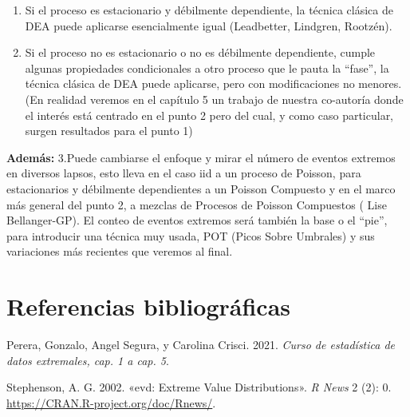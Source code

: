 \documentclass[
  oneside]{book}
\providecommand{\tightlist}{%
  \setlength{\itemsep}{0pt}\setlength{\parskip}{0pt}}
\newlength{\cslhangindent}
\newlength{\cslentryspacingunit} %
\newenvironment{CSLReferences}[2] %
 {%
  \setlength{\parindent}{0pt}
  \ifodd #1
  \let\oldpar\par
  \def\par{\hangindent=\cslhangindent\oldpar}
  \fi
  \setlength{\parskip}{#2\cslentryspacingunit}
 }%
 {}
\begin{document}
\begin{enumerate}
\def\labelenumi{\arabic{enumi}.}
\tightlist
\item
  Si el proceso es estacionario y débilmente dependiente, la técnica
  clásica de DEA puede aplicarse esencialmente igual (Leadbetter,
  Lindgren, Rootzén).
\item
  Si el proceso no es estacionario o no es débilmente dependiente,
  cumple algunas propiedades condicionales a otro proceso que le pauta
  la ``fase'', la técnica clásica de DEA puede aplicarse, pero con
  modificaciones no menores. (En realidad veremos en el capítulo 5 un
  trabajo de nuestra co-autoría donde el interés está centrado en el
  punto 2 pero del cual, y como caso particular, surgen resultados para
  el punto 1)
\end{enumerate}

\textbf{Además:} 3.Puede cambiarse el enfoque y mirar el número de
eventos extremos en diversos lapsos, esto lleva en el caso iid a un
proceso de Poisson, para estacionarios y débilmente dependientes a un
Poisson Compuesto y en el marco más general del punto 2, a mezclas de
Procesos de Poisson Compuestos ( Lise Bellanger-GP). El conteo de
eventos extremos será también la base o el ``pie'', para introducir una
técnica muy usada, POT (Picos Sobre Umbrales) y sus variaciones más
recientes que veremos al final.

\newpage

\hypertarget{referencias-bibliogruxe1ficas}{%
\chapter{Referencias
bibliográficas}\label{referencias-bibliogruxe1ficas}}

\vspace{1cm}
\setlength{\parindent}{-0.2in}
\setlength{\leftskip}{0.2in}

\hypertarget{refs}{}
\begin{CSLReferences}{1}{0}
\leavevmode{}%
Perera, Gonzalo, Angel Segura, y Carolina Crisci. 2021. \emph{Curso de
estadística de datos extremales, cap. 1 a cap. 5}.

\leavevmode{}%
Stephenson, A. G. 2002. {«evd: Extreme Value Distributions»}. \emph{R
News} 2 (2): 0. \url{https://CRAN.R-project.org/doc/Rnews/}.

\end{CSLReferences}

\backmatter
\end{document}

